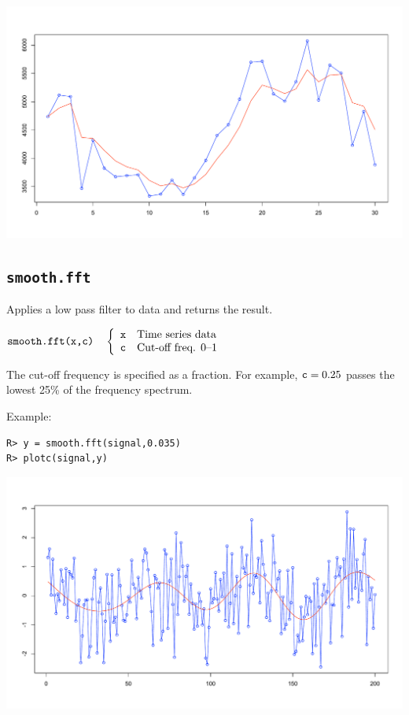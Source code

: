 \documentclass[12pt]{article}
\begin{document}
\begin{center}
\includegraphics[scale=0.3]{Rplot-11.pdf}
\end{center}

\newpage

\subsection{\tt smooth.fft}
Applies a low pass filter to data and returns the result.

\bigskip
$
\hbox{\tt smooth.fft(x,c)}\quad\left\{\begin{array}{ll}
{\tt x} & \hbox{Time series data}\\
{\tt c} & \hbox{Cut-off freq. 0--1}
\end{array}\right.
$

\bigskip
\noindent
The cut-off frequency is specified as a fraction.
For example, ${\tt c}=0.25$ passes the lowest 25\% of the frequency spectrum.

\bigskip
\noindent
Example:

\begin{verbatim}
R> y = smooth.fft(signal,0.035)
R> plotc(signal,y)
\end{verbatim}

\begin{center}
\includegraphics[scale=0.3]{Rplot-2.pdf}
\end{center}
\end{document}
